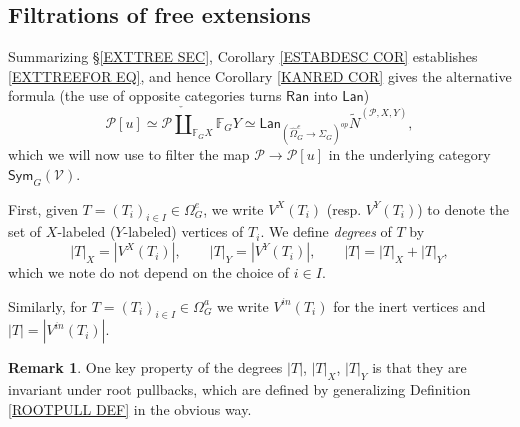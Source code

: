 \documentclass[a4paper,10pt
,draft
]{article}%
\numberwithin{equation}{section}
\numberwithin{figure}{section}
\theoremstyle{definition} %
\newtheorem{remark}[equation]{Remark}%
\newcommand{\Sym}{\ensuremath{\mathsf{Sym}}}%
\newcommand{\V}{\ensuremath{\mathcal V}}
\newcommand{\1}{\ensuremath{\mathbbm 1}}%
\begin{document}
\renewcommand{\labelenumi}{\theenumi}
\renewcommand{\theenumi}{(\roman{enumi})}%

\subsection{Filtrations of free extensions}
\label{FILTRATION_SECTION}

Summarizing \S \ref{EXTTREE SEC},
Corollary \ref{ESTABDESC COR}
establishes \eqref{EXTTREEFOR EQ}, and hence 
Corollary \ref{KANRED COR} 
gives the alternative formula
(the use of opposite categories turns 
$\mathsf{Ran}$ into $\mathsf{Lan}$)
\begin{equation}\label{ALTFOR EQ}
	\mathcal{P}[u] \simeq
	\mathcal{P} \mathbin{\check{\coprod}}_{\mathbb{F}_G X} \mathbb{F}_G Y 
\simeq 
	\mathsf{Lan}_{\left( \widehat{\Omega}_{G}^{e} \to \Sigma_G \right)^{op}}
	\tilde{N}^{(\mathcal{P},X,Y)},
\end{equation}
which we will now use to 
filter the map
$\mathcal{P} \to \mathcal{P}[u]$
in the underlying category
$\Sym_G(\V)$.

First, given 
$T = (T_i)_{i \in I} \in \Omega_G^e$,
we write $V^X(T_i)$ (resp. $V^Y(T_i)$)
to denote the set of 
$X$-labeled ($Y$-labeled) vertices of $T_i$.
We define \textit{degrees} of $T$ by
\[
|T|_X = |V^X(T_i)|,
	\qquad
|T|_Y = |V^Y(T_i)|,
	\qquad
|T| = |T|_X + |T|_Y,
\]
which we note do not depend on the choice of $i \in I$.

Similarly, for $T = (T_i)_{i \in I} \in \Omega_G^a$
we write $V^{in}(T_i)$ for the inert vertices and
$|T| = |V^{in}(T_i)|$.

\begin{remark}
	One key property of the degrees $|T|$, $|T|_X$, $|T|_Y$ is that they are invariant under root pullbacks, which are defined
	by generalizing Definition \ref{ROOTPULL DEF}
	in the obvious way.
\end{remark}
\end{document}
